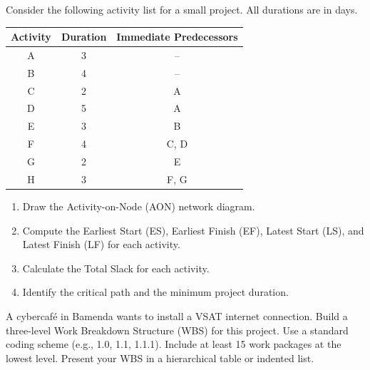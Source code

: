 \documentclass[11pt]{article}
\newcounter{popsec}
\newcounter{popsub}
\newcommand{\courssub}[1]{%
  \stepcounter{popsub}%
  \par\vspace{9pt}\noindent{\popxbold\fontsize{11.5}{13}\selectfont\color{popink}{\color{poporange}\thepopsec.\thepopsub}\hspace{6pt}#1}\par\nopagebreak\vspace{4pt}
}
\begin{document}
\begin{exercice}
Consider the following activity list for a small project. All durations are in days.
\begin{center}
\begin{tabular}{|c|c|c|}
\hline
Activity & Duration & Immediate Predecessors \\
\hline
A & 3 & -- \\
B & 4 & -- \\
C & 2 & A \\
D & 5 & A \\
E & 3 & B \\
F & 4 & C, D \\
G & 2 & E \\
H & 3 & F, G \\
\hline
\end{tabular}
\end{center}
\begin{enumerate}
    \item Draw the Activity-on-Node (AON) network diagram.
    \item Compute the Earliest Start (ES), Earliest Finish (EF), Latest Start (LS), and Latest Finish (LF) for each activity.
    \item Calculate the Total Slack for each activity.
    \item Identify the critical path and the minimum project duration.
\end{enumerate}
\end{exercice}

\courssub{I practise}

\begin{exercice}
A cybercafé in Bamenda wants to install a VSAT internet connection. Build a three-level Work Breakdown Structure (WBS) for this project. Use a standard coding scheme (e.g., 1.0, 1.1, 1.1.1). Include at least 15 work packages at the lowest level. Present your WBS in a hierarchical table or indented list.
\end{exercice}
\end{document}
